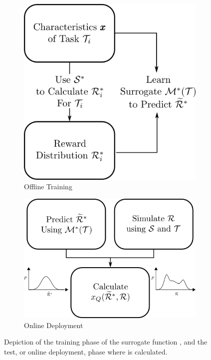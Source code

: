 \begin{figure}[tbp]
    \centering
    \begin{subfigure}[c]{0.50\linewidth}
        \centering
        \includegraphics[width=0.8\linewidth]{Figures/SQ_train.png}
        \vfill
        \caption{Offline Training}
        \label{fig:sq_train}
    \end{subfigure}%
    \hfill
    \begin{subfigure}[c]{0.50\linewidth}
        \centering
        \includegraphics[width=0.8\linewidth]{Figures/SQ_test.png}
        \caption{Online Deployment}
        \label{fig:sq_test}
    \end{subfigure} 
    \caption{Depiction of the training phase of the surrogate function \surrogate, and the test, or online deployment, phase where \xQ{} is calculated.}
    \label{fig:sq_test_train}
\end{figure}

